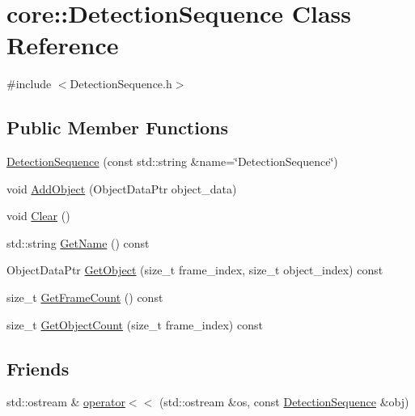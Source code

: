 \hypertarget{classcore_1_1DetectionSequence}{}\section{core\+:\+:Detection\+Sequence Class Reference}
\label{classcore_1_1DetectionSequence}


{\ttfamily \#include $<$Detection\+Sequence.\+h$>$}

\subsection*{Public Member Functions}
\begin{DoxyCompactItemize}
\item 
\hyperlink{classcore_1_1DetectionSequence_a2cbdc8db34fe87932653826fc8a3c1f7}{Detection\+Sequence} (const std\+::string \&name=\char`\"{}Detection\+Sequence\char`\"{})
\item 
void \hyperlink{classcore_1_1DetectionSequence_a3cc0fdf3281f34985f4762086293db72}{Add\+Object} (Object\+Data\+Ptr object\+\_\+data)
\item 
void \hyperlink{classcore_1_1DetectionSequence_ab62569a3e51d58457057deba12ef6892}{Clear} ()
\item 
std\+::string \hyperlink{classcore_1_1DetectionSequence_a7927349cfecfb5882553f7c4da92209c}{Get\+Name} () const 
\item 
Object\+Data\+Ptr \hyperlink{classcore_1_1DetectionSequence_a2c5ea2fe612a58f521ab54fc911d7a8e}{Get\+Object} (size\+\_\+t frame\+\_\+index, size\+\_\+t object\+\_\+index) const 
\item 
size\+\_\+t \hyperlink{classcore_1_1DetectionSequence_af3fa7fba659a56c25306cf4fa603750d}{Get\+Frame\+Count} () const 
\item 
size\+\_\+t \hyperlink{classcore_1_1DetectionSequence_af555322a7103a9c083d426b34815fb69}{Get\+Object\+Count} (size\+\_\+t frame\+\_\+index) const 
\end{DoxyCompactItemize}
\subsection*{Friends}
\begin{DoxyCompactItemize}
\item 
std\+::ostream \& \hyperlink{classcore_1_1DetectionSequence_a557132cfbb170daf47f5a890a0c5bac0}{operator$<$$<$} (std\+::ostream \&os, const \hyperlink{classcore_1_1DetectionSequence}{Detection\+Sequence} \&obj)
\end{DoxyCompactItemize}


